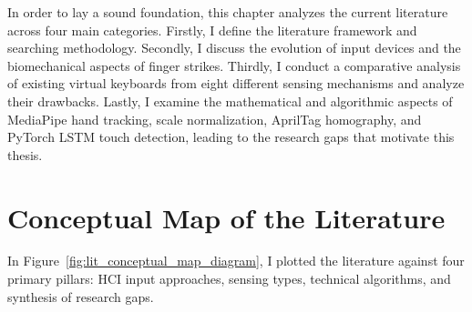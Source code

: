 In order to lay a sound foundation, this chapter analyzes the current literature across four main categories. Firstly, I define the literature framework and searching methodology. Secondly, I discuss the evolution of input devices and the biomechanical aspects of finger strikes. Thirdly, I conduct a comparative analysis of existing virtual keyboards from eight different sensing mechanisms and analyze their drawbacks. Lastly, I examine the mathematical and algorithmic aspects of MediaPipe hand tracking, scale normalization, AprilTag homography, and PyTorch LSTM touch detection, leading to the research gaps that motivate this thesis.

\section{Conceptual Map of the Literature}
\label{sec:lit_conceptual_map}
In Figure~\ref{fig:lit_conceptual_map_diagram}, I plotted the literature against four primary pillars: HCI input approaches, sensing types, technical algorithms, and synthesis of research gaps.

